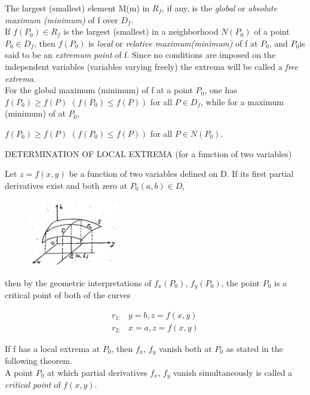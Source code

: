 \documentclass[11pt]{amsbook}
\begin{document}

The largest (smallest) element M(m) in $R_{f}$, if any, is the \textit{global} or \textit{absolute maximum (minimum)} of f over $D_{f}$.
\\

If $f\left ( P_{0} \right ) \in R_{f} $ is the largest (smallest) in a neighborhood $N(P_{0})$ of a point $P_{0} \in D_{f} $, then $f\left ( P_{0} \right )$ is \textit{local} or \textit{relative maximum(minimum)} of f at $P_{0}$, and $P_{0}$is said to be an \textit{extremum point} of f. Since no conditions are imposed on the independent variables (variables varying freely) the extrema will be called a \textit{free extrema}.
\\

For the global maximum (minimum) of f at a point $P_{0}$, one has 
\\

$f\left ( P_{0} \right ) \geq f\left ( P \right )$ $(  f\left ( P_{0} \right ) \leq  f\left ( P \right ))$ for all $P \in D_{f}$, while for a maximum (minimum) of at $P_{0}$,
\begin{center}
$f\left ( P_{0} \right ) \geq f\left ( P \right )$ $(  f\left ( P_{0} \right ) \leq  f\left ( P \right ))$ for all $P \in N(P_{0})$.
\end{center}

DETERMINATION OF LOCAL EXTREMA (for a function of two variables)

Let $z= f(x, y)$ be a function of two variables defined on D. If its first partial derivatives exist and both zero at $P_{0}(a, b) \in D $, 
\begin{figure}
	\includegraphics[width=4cm]{images/b2p2-328-fig01.png}
\end{figure} 
then by the geometric interpretations of $f_{x}(P_{0})$, $f_{y}(P_{0})$, the point $P_{0} $ is a critical point of both of the curves 


\begin{align*}
r_{1: } &  y  = b,   z = f(x, y)      \\
r_{2: } &  x  = a,   z = f(x, y)
\end{align*}


If f has a local extrema at $P_{0}$, then $f_{x}$, $f_{y}$ vanish both at $P_{0}$ as stated in the following theorem.
\\

A point $P_{0}$ at which partial derivatives $f_{x}$, $f_{y}$ vanish simultaneously is called a \textit{critical point} of $f(x, y)$.


\end{document}
